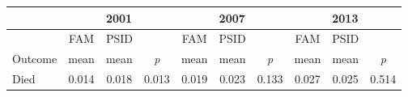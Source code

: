 \begin{tabular}{p{1.2in}*{3}{c}*{3}{c}*{3}{c}}
\hline
 \multicolumn{1}{c}{} & \multicolumn{3}{c}{2001} & \multicolumn{3}{c}{2007} & \multicolumn{3}{c}{2013} \\
\hline
 \multicolumn{1}{c}{} & FAM & PSID & & FAM & PSID & & FAM & PSID & \\
 \multicolumn{1}{l}{Outcome} & mean & mean &\textit{p} & mean & mean &\textit{p} & mean & mean &\textit{p} \\
\hline
Died&0.014&0.018&0.013&0.019&0.023&0.133&0.027&0.025&0.514\\
\hline
\end{tabular}
